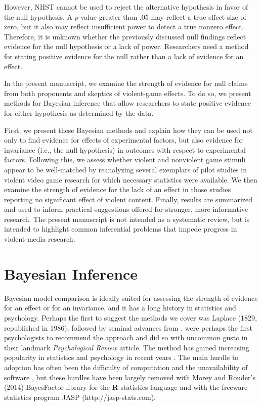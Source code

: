 \documentclass[man]{apa6}
\begin{document}
However, NHST cannot be used to  reject the alternative hypothesis in favor of the null hypothesis. A $p$-value greater than .05 may reflect a true effect size of zero, but it also may reflect insufficient power to detect a true nonzero effect. Therefore, it is unknown whether the previously discussed null findings reflect evidence for the null hypothesis or a lack of power.  Researchers need a method for stating positive evidence for the null rather than a lack of evidence for an effect.

In the present manuscript, we examine the strength of evidence for null claims from both proponents and skeptics of violent-game effects.  To do so, we present methods for Bayesian inference that allow researchers to state positive evidence for either hypothesis as determined by the data. 

First, we present these Bayesian methods and explain how they can be used not only to find evidence for effects of experimental factors, but also evidence for invariance (i.e., the null hypothesis) in outcomes with respect to experimental factors. Following this, we assess whether violent and nonviolent game stimuli appear to be well-matched by reanalyzing several exemplars of pilot studies in violent video game research for which necessary statistics were available.  We then examine the strength of evidence for the lack of an effect in those studies reporting no significant effect of violent content.  
Finally, results are summarized and used to inform practical suggestions offered for stronger, more informative research. 
The present manuscript is not intended as a systematic review, but is intended to highlight common inferential problems that impede progress in violent-media research.

\section{Bayesian Inference}
Bayesian model comparison is ideally suited for assessing the strength of evidence for an effect or for an invariance, and it has a long history in statistics and psychology.  Perhaps the first to suggest the methods we cover was Laplace (1829, republished in 1986), followed by seminal advances from \citet{Jeffreys:1961}.  \citet{Edwards:etal:1963} were perhaps the first psychologists to recommend the approach and did so with uncommon gusto in their landmark {\em Psychological Review} article.  The method has gained increasing popularity in statistics and psychology in recent years \citep{Berger:Delampady:1987,Gallistel:2009,Raftery:1995,Rouder:etal:2009a,Wagenmakers:2007}. The main hurdle to adoption has often been the difficulty of computation and the unavailability of software \citep{Gallistel:2009}, but these hurdles have been largely removed with Morey and Rouder's (2014) BayesFactor library for the {\bf R} statistics language and with the freeware statistics program JASP (http://jasp-stats.com).
\end{document}
